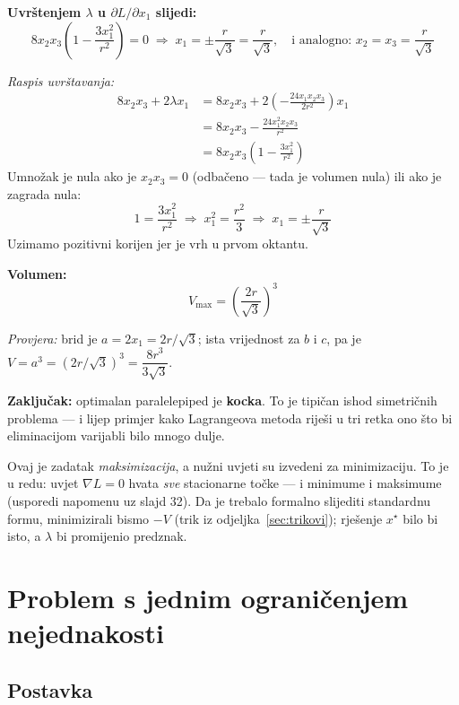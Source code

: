 \textbf{Uvrštenjem $\lambda$ u $\partial L/\partial x_1$ slijedi:}
\[
8x_2x_3\left(1 - \frac{3x_1^2}{r^2}\right) = 0
\;\Longrightarrow\;
x_1 = \pm\frac{r}{\sqrt3} = \frac{r}{\sqrt3},
\quad\text{i analogno: } x_2 = x_3 = \frac{r}{\sqrt3}
\]

\emph{Raspis uvrštavanja:}
\begin{align}
8x_2x_3 + 2\lambda x_1
&= 8x_2x_3 + 2\left(-\frac{24x_1x_2x_3}{2r^2}\right)x_1 \\
&= 8x_2x_3 - \frac{24x_1^2x_2x_3}{r^2} \\
&= 8x_2x_3\left(1 - \frac{3x_1^2}{r^2}\right)
\end{align}
Umnožak je nula ako je $x_2x_3 = 0$ (odbačeno --- tada je volumen nula) ili ako
je zagrada nula:
\[
1 = \frac{3x_1^2}{r^2} \;\Longrightarrow\; x_1^2 = \frac{r^2}{3}
\;\Longrightarrow\; x_1 = \pm\frac{r}{\sqrt3}
\]
Uzimamo pozitivni korijen jer je vrh u prvom oktantu. \checkmark

\textbf{Volumen:}
\[
V_{\max} = \left(\frac{2r}{\sqrt3}\right)^{3}
\]

\emph{Provjera:} brid je $a = 2x_1 = 2r/\sqrt3$; ista vrijednost za $b$ i $c$,
pa je $V = a^3 = (2r/\sqrt3)^3 = \dfrac{8r^3}{3\sqrt3}$. \checkmark

\textbf{Zaključak:} optimalan paralelepiped je \textbf{kocka}. To je tipičan
ishod simetričnih problema --- i lijep primjer kako Lagrangeova metoda riješi u
tri retka ono što bi eliminacijom varijabli bilo mnogo dulje.

\begin{napomena}
Ovaj je zadatak \emph{maksimizacija}, a nužni uvjeti su izvedeni za
minimizaciju. To je u redu: uvjet $\nabla L = 0$ hvata \emph{sve} stacionarne
točke --- i minimume i maksimume (usporedi napomenu uz slajd 32). Da je trebalo
formalno slijediti standardnu formu, minimizirali bismo $-V$
(trik iz odjeljka~\ref{sec:trikovi}); rješenje $x^\star$ bilo bi isto, a
$\lambda$ bi promijenio predznak.
\end{napomena}

\section{Problem s jednim ograničenjem nejednakosti}
\label{sec:nejednakost}

\subsection{Postavka}

